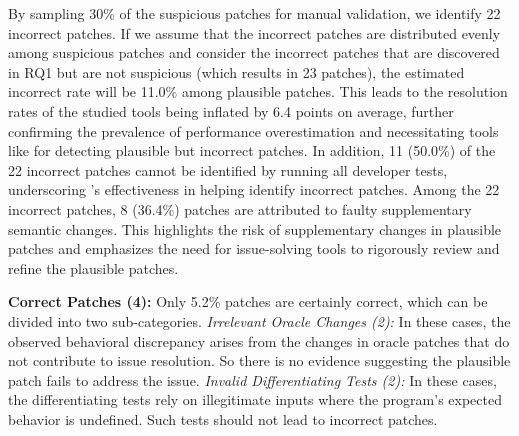 %
%

By sampling 30\% of the suspicious patches for manual validation, we identify 22 incorrect patches.
If we assume that the incorrect patches are distributed evenly among suspicious patches and consider the incorrect patches that are discovered in RQ1 but are not suspicious (which results in 23 patches), the estimated incorrect rate will be 11.0\% among plausible patches. 
This leads to the resolution rates of the studied tools being inflated by 6.4 points on average, 
further confirming the prevalence of performance overestimation and necessitating tools like \appname for detecting plausible but incorrect patches. 
In addition, 11 (50.0\%) of the 22 incorrect patches cannot be identified by running all developer tests, underscoring \appname's effectiveness in helping identify incorrect patches.
Among the 22 incorrect patches, 8 (36.4\%) patches are attributed to faulty supplementary semantic changes.
This highlights the risk of supplementary changes in plausible patches and emphasizes the need for issue-solving tools to rigorously review and refine the plausible patches.

%
\textbf{Correct Patches (4):} Only 5.2\% patches are certainly correct, which can be divided into two sub-categories.
 \textit{Irrelevant Oracle Changes (2):}
In these cases, the observed behavioral discrepancy arises from the changes in oracle patches that do not contribute to issue resolution.  
So there is no evidence suggesting the plausible patch fails to address the issue. 
 \textit{Invalid Differentiating Tests (2):}
In these cases, the differentiating tests rely on illegitimate inputs where the program's expected behavior is undefined.
Such tests should not lead to incorrect patches. 

